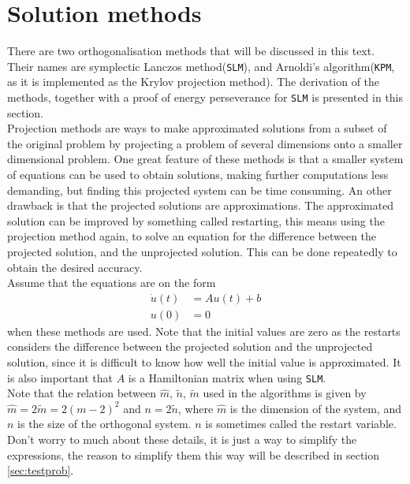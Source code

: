 \section{Solution methods} \label{sec:solmet} %
There are two orthogonalisation methods that will be discussed in this text. Their names are symplectic Lanczos method(\texttt{SLM}), and Arnoldi's algorithm(\texttt{KPM}, as it is implemented as the Krylov projection method). The derivation of the methods, together with a proof of energy perseverance for \texttt{SLM} is presented in this section. \\


Projection methods are ways to make approximated solutions from a subset of the original problem by projecting a problem of several dimensions onto a smaller dimensional problem. One great feature of these methods is that a smaller system of equations can be used to obtain solutions, making further computations less demanding, but finding this projected system can be time consuming. An other drawback is that the projected solutions are approximations. The approximated solution can be improved by something called restarting, this means using the projection method again, to solve an equation for the difference between the projected solution, and the unprojected solution. This can be done repeatedly to obtain the desired accuracy. \\

Assume that the equations are on the form
\begin{equation}
\begin{aligned}
\dot{u}(t) &= Au(t) + b \\
u(0) &= 0
\end{aligned}
\label{eqn:PMform}
\end{equation}
when these methods are used. Note that the initial values are zero as the restarts considers the difference between the projected solution and the unprojected solution, since it is difficult to know how well the initial value is approximated. It is also important that $A$ is a Hamiltonian matrix when using \texttt{SLM}. \\

Note that the relation between $\hat{m}$, $\tilde{n}$, $\tilde{m}$ used in the algorithms is given by $\hat{m} = 2\tilde{m}= 2(m-2)^2$ and $ n = 2\tilde{n}$, where $\hat{m}$ is the dimension of the system, and $n$ is the size of the orthogonal system. $n$ is sometimes called the restart variable. Don't worry to much about these details, it is just a way to simplify the expressions, the reason to simplify them this way will be described in section \ref{sec:testprob}. \\

